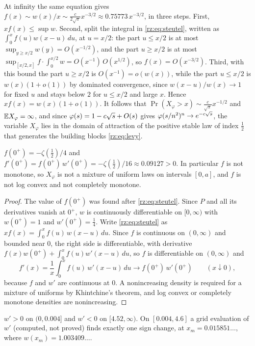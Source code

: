 At infinity the same equation gives $f(x)\sim w(x)/x\sim\frac{c}{2\sqrt\pi}x^{-3/2}\approx0.75773\,x^{-3/2}$, in three steps. First, $xf(x)\le\sup w$. Second, split the integral in \eqref{rz:eq:steutel}, written as $\int_0^xf(u)w(x-u)\,du$, at $u=x/2$: the part $u\le x/2$ is at most $\sup_{y\ge x/2}w(y)=O(x^{-1/2})$, and the part $u\ge x/2$ is at most $\sup_{[x/2,x]}f\cdot\int_0^{x/2}w=O(x^{-1})\,O(x^{1/2})$, so $f(x)=O(x^{-3/2})$. Third, with this bound the part $u\ge x/2$ is $O(x^{-1})=o(w(x))$, while the part $u\le x/2$ is $w(x)(1+o(1))$ by dominated convergence, since $w(x-u)/w(x)\to1$ for fixed $u$ and stays below $2$ for $u\le x/2$ and large $x$. Hence $xf(x)=w(x)(1+o(1))$. It follows that $\Pr(X_\varphi>x)\sim\frac{c}{\sqrt\pi}x^{-1/2}$ and $\mathbb{E} X_\varphi=\infty$, and since $\varphi(s)=1-c\sqrt{s}+O(s)$ gives $\varphi(s/n^2)^n\to e^{-c\sqrt{s}}$, the variable $X_\varphi$ lies in the domain of attraction of the positive stable law of index $\frac12$ that generates the building blocks \eqref{rz:eq:levy}.

\begin{theorem}\label{rz:thm:shape}
$f(0^+)=-\zeta(\frac12)/4$ and $f'(0^+)=f(0^+)\,w'(0^+)=-\zeta(\frac12)/16\approx0.09127>0$. In particular $f$ is not monotone, so $X_\varphi$ is not a mixture of uniform laws on intervals $[0,a]$, and $f$ is not log convex and not completely monotone.
\end{theorem}

\begin{proof}
The value of $f(0^+)$ was found after \eqref{rz:eq:steutel}. Since $P$ and all its derivatives vanish at $0^+$, $w$ is continuously differentiable on $[0,\infty)$ with $w(0^+)=1$ and $w'(0^+)=\frac14$. Write \eqref{rz:eq:steutel} as $xf(x)=\int_0^xf(u)\,w(x-u)\,du$. Since $f$ is continuous on $(0,\infty)$ and bounded near $0$, the right side is differentiable, with derivative $f(x)w(0^+)+\int_0^xf(u)w'(x-u)\,du$, so $f$ is differentiable on $(0,\infty)$ and
\[
f'(x)=\frac1x\int_0^xf(u)\,w'(x-u)\,du\longrightarrow f(0^+)\,w'(0^+)\qquad(x\downarrow0),
\]
because $f$ and $w'$ are continuous at $0$. A nonincreasing density is required for a mixture of uniforms by Khintchine's theorem, and log convex or completely monotone densities are nonincreasing.
\end{proof}

\begin{proposition}\label{rz:thm:unimod}
$w'>0$ on $(0,0.004]$ and $w'<0$ on $[4.52,\infty)$. On $[0.004,4.6]$ a grid evaluation of $w'$ (computed, not proved) finds exactly one sign change, at $x_m=0.015851\ldots$, where $w(x_m)=1.003409\ldots$.
\end{proposition}

